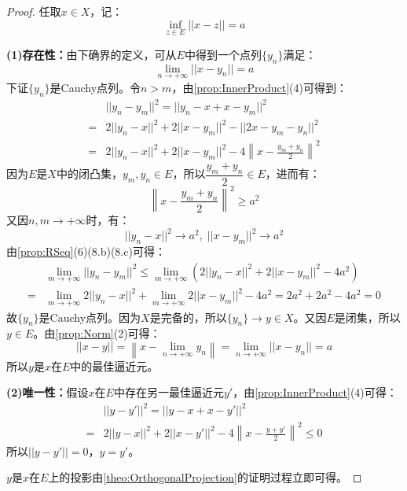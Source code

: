 \begin{proof}
	任取$x\in X$，记：
	\begin{equation*}
		\inf_{z\in E}||x-z||=a
	\end{equation*}\par
	\textbf{(1)存在性：}由下确界的定义，可从$E$中得到一个点列$\{y_n\}$满足：
	\begin{equation*}
		\lim_{n\to+\infty}||x-y_n||=a
	\end{equation*}
	下证$\{y_n\}$是Cauchy点列。令$n>m$，由\cref{prop:InnerProduct}(4)可得到：
	\begin{align*}
		&||y_n-y_m||^2=||y_n-x+x-y_m||^2 \\
		=&2||y_n-x||^2+2||x-y_m||^2-||2x-y_m-y_n||^2 \\
		=&2||y_n-x||^2+2||x-y_m||^2-4\left\|x-\frac{y_m+y_n}{2}\right\|^2
	\end{align*}
	因为$E$是$X$中的闭凸集，$y_m,y_n\in E$，所以$\dfrac{y_m+y_n}{2}\in E$，进而有：
	\begin{equation*}
		\left\|x-\frac{y_m+y_n}{2}\right\|^2\geqslant a^2
	\end{equation*}
	又因$n,m\to+\infty$时，有：
	\begin{equation*}
		||y_n-x||^2\to a^2,\;||x-y_m||^2\to a^2
	\end{equation*}
	由\cref{prop:RSeq}(6)(8.b)(8.c)可得：
	\begin{align*}
		&\lim_{m\to+\infty}||y_n-y_m||^2\leqslant\lim_{m\to+\infty}\left(2||y_n-x||^2+2||x-y_m||^2-4a^2\right) \\
		=&\lim_{m\to+\infty}2||y_n-x||^2+\lim_{m\to+\infty}2||x-y_m||^2-4a^2=2a^2+2a^2-4a^2=0
	\end{align*}
	故$\{y_n\}$是Cauchy点列。因为$X$是完备的，所以$\{y_n\}\to y\in X$。又因$E$是闭集，所以$y\in E$。由\cref{prop:Norm}(2)可得：
	\begin{equation*}
		||x-y||=\left\|x-\lim_{n\to+\infty}y_n\right\|=\lim_{n\to+\infty}||x-y_n||=a
	\end{equation*}
	所以$y$是$x$在$E$中的最佳逼近元。\par
	\textbf{(2)唯一性：}假设$x$在$E$中存在另一最佳逼近元$y'$，由\cref{prop:InnerProduct}(4)可得：
	\begin{align*}
		&||y-y'||^2=||y-x+x-y'||^2 \\
		=&2||y-x||^2+2||x-y'||^2-4\left\|x-\frac{y+y'}{2}\right\|^2\leqslant0
	\end{align*}
	所以$||y-y'||=0$，$y=y'$。\par
	$y$是$x$在$E$上的投影由\cref{theo:OrthogonalProjection}的证明过程立即可得。
\end{proof}
